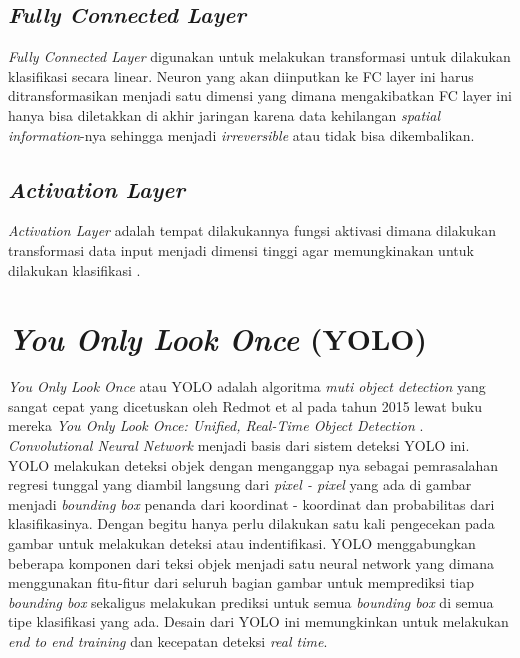 \subsection{\emph{Fully Connected Layer}}
\label{subsec:fullyconnectedlayer}

\par \emph{Fully Connected Layer} digunakan untuk melakukan transformasi untuk dilakukan klasifikasi secara linear.
Neuron yang akan diinputkan ke FC layer ini harus ditransformasikan menjadi satu dimensi yang dimana
mengakibatkan FC layer ini hanya bisa diletakkan di akhir jaringan karena data kehilangan \emph{spatial information}-nya
sehingga menjadi \emph{irreversible} atau tidak bisa dikembalikan.

\subsection{\emph{Activation Layer}}
\label{subsec:activationlayer}

\par \emph{Activation Layer} adalah tempat dilakukannya fungsi aktivasi dimana dilakukan transformasi data input
menjadi dimensi tinggi agar memungkinakan untuk dilakukan klasifikasi \cite{putra2016klasifikasi}.



\section{\emph{You Only Look Once} (YOLO)}
\label{sec:youonlylookone}

\emph{You Only Look Once} atau YOLO adalah algoritma \emph{muti object detection} yang sangat cepat yang dicetuskan oleh Redmot et al pada tahun 2015
lewat buku mereka \emph{You Only Look Once: Unified, Real-Time Object Detection} \cite{redmon2016you}. \emph{Convolutional Neural Network} menjadi basis dari sistem deteksi YOLO ini.
YOLO melakukan deteksi objek dengan menganggap nya sebagai pemrasalahan regresi tunggal yang diambil langsung dari \emph{pixel - pixel} yang ada
di gambar menjadi \emph{bounding box} penanda dari koordinat - koordinat dan probabilitas dari klasifikasinya. Dengan begitu
hanya perlu dilakukan satu kali pengecekan pada gambar untuk melakukan deteksi atau indentifikasi. \cite{redmon2016you}
YOLO menggabungkan beberapa komponen dari teksi objek menjadi satu neural network yang dimana menggunakan fitu-fitur
dari seluruh bagian gambar untuk memprediksi tiap \emph{bounding box} sekaligus melakukan prediksi untuk semua
\emph{bounding box} di semua tipe klasifikasi yang ada. Desain dari YOLO ini memungkinkan untuk melakukan
\emph{end to end training} dan kecepatan deteksi \emph{real time}.

